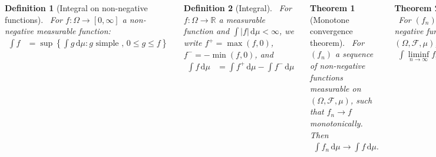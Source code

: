 \documentclass{tikzposter} %
\newtheorem{theorem}{Theorem}
\newtheorem{lemma}[theorem]{Lemma}
\newtheorem{definition}{Definition}
\begin{document}
\begin{columns}
{    \begin{definition}[Integral on non-negative functions]
    \ For $f : \Omega \to [0,\infty]$ a non-negative measurable function:
    \begin{align*}
      \int f &= \sup \left\{\int g \,\mathrm{d}\mu : g \text{ simple },\, 0 \le g \le f \right\}
    \end{align*}
    \end{definition}
    \hphantom{}

    \begin{definition}[Integral]
      \ For $f : \Omega \to \mathbb{R}$ a measurable function and $\int |f| \, \mathrm{d}\mu < \infty$, we write $f^{+} = \max(f,0)$, $f^{-} = -\min(f,0)$, and
      \begin{align*}
        \int f \, \mathrm{d}\mu &= \int f^{+} \, \mathrm{d}\mu - \int f^{-} \, \mathrm{d}\mu
      \end{align*}
    \end{definition}
    \hphantom{}

    \begin{theorem}[Monotone convergence theorem]
      \ For $(f_{n})$ a sequence of non-negative functions measurable on $(\Omega, \mathcal{F}, \mu)$, such that $f_{n} \to f$ monotonically. Then
      \begin{align*}
        \int f_{n} \, \mathrm{d}\mu \to \int f \, \mathrm{d}\mu.
      \end{align*}
    \end{theorem}
    \hphantom{}

    \begin{theorem}[Fatou's lemma]
      \ For $(f_{n})$ a sequence of non-negative functions measurable on $(\Omega, \mathcal{F}, \mu)$,
      \begin{align*}
        \int \liminf_{n \to \infty} f_{n} \, \mathrm{d}\mu \le \liminf_{n \to \infty} \int f_{n} \, \mathrm{d}\mu
      \end{align*}
    \end{theorem}
    \hphantom{}

    \begin{lemma}[Reverse Fatou's lemma]
    \ For $(f_{n})$ a sequence of non-negative functions measurable on $(\Omega, \mathcal{F}, \mu)$, assume that there is an integrable function $g$ such that $f_{n} \le g$ for $n \ge 1$. Then
    \begin{align*}
      \int \limsup_{n \to \infty} f_{n} \, \mathrm{d}\mu \ge \limsup_{n \to \infty} \int f_{n} \, \mathrm{d}\mu
    \end{align*}
    \end{lemma}
    \hphantom{}

}
\end{columns}
\end{document}
